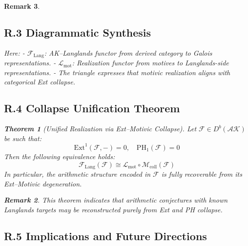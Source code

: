 \documentclass[11pt]{article}
\newtheorem{theorem}{Theorem}[section]
\newtheorem{remark}[theorem]{Remark}
\begin{document}
\begin{remark}
\subsection*{R.3 Diagrammatic Synthesis}

\vspace{1em}
\begin{center}
\end{center}
\vspace{1em}

Here:
- \( \mathcal{F}_{\mathrm{Lang}} \): AK–Langlands functor from derived category to Galois representations.
- \( \mathcal{L}_{\mathrm{mot}} \): Realization functor from motives to Langlands-side representations.
- The triangle expresses that motivic realization aligns with categorical Ext collapse.

\subsection*{R.4 Collapse Unification Theorem}

\begin{theorem}[Unified Realization via Ext–Motivic Collapse]
Let \( \mathcal{F} \in D^b(\mathcal{AK}) \) be such that:
\[
\mathrm{Ext}^1(\mathcal{F}, -) = 0, \quad \mathrm{PH}_1(\mathcal{F}) = 0
\]
Then the following equivalence holds:
\[
\mathcal{F}_{\mathrm{Lang}}(\mathcal{F}) \cong \mathcal{L}_{\mathrm{mot}} \circ \mathcal{M}_{\mathrm{coll}}(\mathcal{F})
\]
In particular, the arithmetic structure encoded in \( \mathcal{F} \) is fully recoverable from its Ext–Motivic degeneration.
\end{theorem}

\begin{remark}
This theorem indicates that arithmetic conjectures with known Langlands targets may be reconstructed purely from Ext and PH collapse.
\end{remark}

\subsection*{R.5 Implications and Future Directions}


\end{remark}
\end{document}
